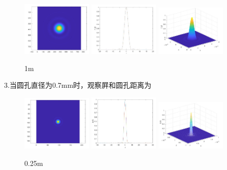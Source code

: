 \documentclass[12pt,a4paper,UTF8]{ctexart}
\begin{document}
\begin{figure}[htbp]
	\centering
	\includegraphics[width=0.3\textwidth]{img//1.7.jpg}
	\includegraphics[width=0.3\textwidth]{img//1.8.jpg}
	\includegraphics[width=0.3\textwidth]{img//1.9.jpg}
	\caption{1m}
\end{figure}
\newpage
3.当圆孔直径为0.7mm时，观察屛和圆孔距离为
\begin{figure}[htbp]
	\centering
	\includegraphics[width=0.3\textwidth]{img//0.254.jpg}
	\includegraphics[width=0.3\textwidth]{img//0.255.jpg}
	\includegraphics[width=0.3\textwidth]{img//0.256.jpg}
	\caption{0.25m}
\end{figure}
\end{document}
